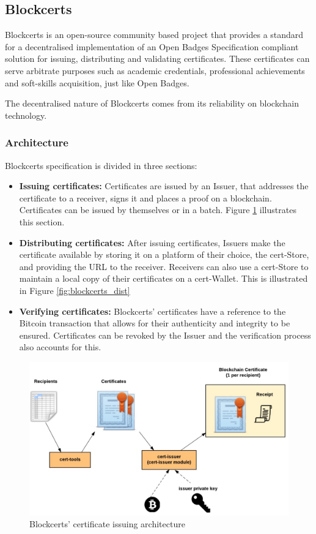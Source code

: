 \documentclass[llncsdoc]{llncs}
\begin{document}
\subsection{Blockcerts}
\label{rel:blockcerts}

Blockcerts is an open-source community based project that provides a standard for a decentralised implementation of an Open Badges Specification compliant solution for issuing, distributing and validating certificates. These certificates can serve arbitrate purposes such as academic credentials, professional achievements and soft-skills acquisition, just like Open Badges.

The decentralised nature of Blockcerts comes from its reliability on blockchain technology.



\subsubsection{Architecture}
Blockcerts specification is divided in three sections:
\begin{itemize}
    \item \textbf{Issuing certificates:} Certificates are issued by an Issuer, that addresses the certificate to a receiver, signs it and places a proof on a blockchain. Certificates can be issued by themselves or in a batch. Figure \ref{fig:blockcerts_arch} illustrates this section.
    \item \textbf{Distributing certificates:} After issuing certificates, Issuers make the certificate available by storing it on a platform of their choice, the cert-Store, and providing the URL to the receiver. Receivers can also use a cert-Store to maintain a local copy of their certificates on a cert-Wallet. This is illustrated in Figure \ref{fig:blockcerts_dist}
    \item \textbf{Verifying certificates:} Blockcerts' certificates have a reference to the Bitcoin transaction that allows for their authenticity and integrity to be ensured. Certificates can be revoked by the Issuer and the verification process also accounts for this.
\end{itemize}


\begin{figure}[t!]
  \includegraphics[width=\linewidth]{figures/blockcerts_arch.jpg}
  \caption{Blockcerts' certificate issuing architecture}
  \label{fig:blockcerts_arch}
\end{figure}
\end{document}
